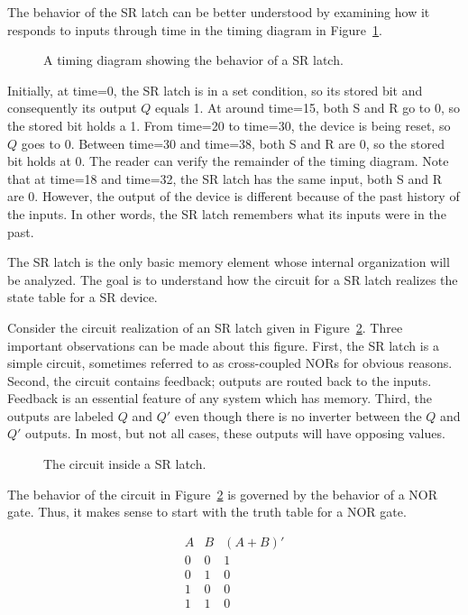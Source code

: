The behavior of the SR latch can be better understood
by examining how it responds to inputs through time in the 
timing diagram in Figure~\ref{fig:sequentialCirSRLtime}.

\begin{figure}[ht]
\caption{A timing diagram showing the behavior of a 
SR latch.}
\label{fig:sequentialCirSRLtime}
\end{figure}

Initially, at time=0, the SR latch is in a set condition, so its
stored bit and consequently its output $Q$ equals 1.  At around
time=15, both S and R go to 0, so the stored bit holds a 1.  From
time=20 to time=30, the device is being reset, so $Q$ goes to 0.  Between
time=30 and time=38, both S and R are 0, so the stored bit holds at 0.
The reader can verify the remainder of the timing diagram.  
Note that at time=18 and time=32, the SR latch has the same input, both
S and R are 0.  However, the output of the device is different because
of the past history of the inputs.  In other words, the SR latch
remembers what its inputs were in the past.

The SR latch is the only basic memory element whose internal
organization will be analyzed.  The goal is to understand how
the circuit for a SR latch realizes the state table for a SR
device.  

Consider the circuit realization of an SR latch 
given in Figure~\ref{fig:sequentialCirSRL}.  Three important
observations can be made about this figure. First, the SR 
latch is a simple circuit, sometimes referred to as cross-coupled 
NORs for obvious reasons.  Second, the circuit contains feedback;
outputs are routed back to the inputs.  Feedback is an essential 
feature of any system which has memory.  Third, the outputs are 
labeled $Q$ and $Q'$ even though there is no inverter between the 
$Q$ and $Q'$ outputs.  In most, but not all cases, these 
outputs will have opposing values.

\begin{figure}[ht]
\caption{The circuit inside a SR latch.}
\label{fig:sequentialCirSRL}
\end{figure}

The behavior of the circuit in Figure~\ref{fig:sequentialCirSRL} is governed
by the behavior of a NOR gate.  Thus, it makes sense to start with
the truth table for a NOR gate.

$$\begin{array}{c|c||c}
A  & B  & (A+B)'  \\ \hline
0  & 0  & 1  \\ \hline
0  & 1  & 0  \\ \hline
1  & 0  & 0  \\ \hline
1  & 1  & 0  \\ 
\end{array}$$

